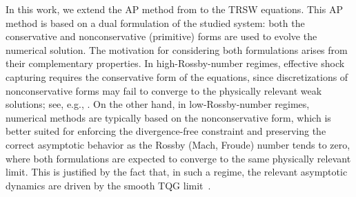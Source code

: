 \documentclass[a4paper,11pt,twoside]{article}
\numberwithin{equation}{section}
\numberwithin{figure}{section}
\numberwithin{table}{section}
\newcommand{\RIIIcolor}[1]{{\leavevmode\color{magenta} #1}}
\begin{document}
In this work, we extend the AP method from \cite{CKKM} to the TRSW equations. This AP method is based on a dual formulation of the studied 
system: both the conservative and nonconservative (primitive) forms are used to evolve the numerical solution. The motivation for
considering both formulations arises from their complementary properties. In high-Rossby-number regimes, effective shock capturing requires
the conservative form of the equations, since discretizations of nonconservative forms may fail to converge to the physically relevant weak
solutions; see, e.g., \cite{Abgrall_2010,Hou_1994}. 
%
On the other hand, in low-Rossby-number regimes, numerical methods are typically based
on the nonconservative form, which is better suited for enforcing the divergence-free constraint and preserving the correct asymptotic
behavior as the Rossby (Mach, Froude) number tends to zero, where both formulations are expected to converge to the same physically
relevant limit.
%
\RIIIcolor{This is justified by the fact that, in such a regime, the relevant asymptotic dynamics are driven by the smooth TQG limit~\cite{Warneford_2013}.}
\end{document}
